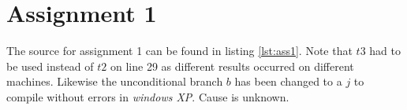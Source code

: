 \section{Assignment 1}
The source for assignment 1 can be found in listing \ref{lst:ass1}. Note that
$t3$ had to be used instead of $t2$ on line 29 as different results occurred on
different machines. Likewise the unconditional branch $b$ has been changed to a $j$ to compile without errors in \emph{windows XP}. Cause is unknown.

